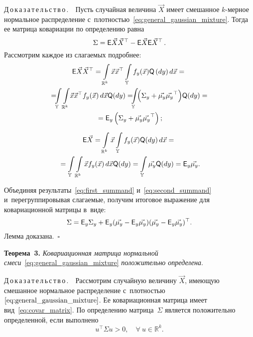 \begin{multicols}{2}
\smallskip

\noindent
Д\,о\,к\,а\,з\,а\,т\,е\,л\,ь\,с\,т\,в\,о\,.\ \
Пусть случайная величина $\vec{X}$ имеет смешанное $k$-мер\-ное нормальное 
распределение с~плотностью~\eqref{eq:general_gaussian_mixture}. 
Тогда ее матрица ковариации по определению равна 
$$
\Sigma = 
{\sf E}\vec{X}\vec{X}^\top - {\sf E}\vec{X}{\sf E}\vec{X}^\top\,.
$$
 Рассмотрим каждое из слагаемых подробнее:
\begin{multline}
{\sf E}\vec{X}\vec{X}^\top =
\int\limits_{\mathbb{R}^k} \vec{x}\vec{x}^\top 
\int\limits_\mathbb{Y} f_y(\vec{x}) {\sf Q}\,(dy) \,{d}\vec{x} = {}\\
{}=
\!\!\!\int\limits_\mathbb{Y} \int\limits_{\mathbb{R}^k} \!\vec{x}\vec{x}^\top f_y(\vec{x})\,d\vec{x} 
{\sf Q}(dy) = 
\!\!\!\int\limits_\mathbb{Y}\!\! \left( \Sigma_y + \vec{\mu_y}\vec{\mu_y}^\top \right)
\! {\sf Q}(dy) = {} \\
 {} = 
{\sf E}_y \left( \Sigma_y + \vec{\mu_y}\vec{\mu_y}^\top \right);
\label{eq:first_summand}
\end{multline}

\vspace*{-12pt}

\noindent
\begin{multline}
\label{eq:second_summand}
{\sf E}\vec{X} =\int\limits_{\mathbb{R}^k} \vec{x} 
\int\limits_\mathbb{Y} f_y(\vec{x}) {\sf Q}(dy)\, d\vec{x} ={}\\
{}=
 \int\limits_\mathbb{Y} \int\limits_{\mathbb{R}^k} \vec{x} f_y(\vec{x}) 
 \,{d}\vec{x} {\sf Q}(dy) =
  \int\limits_\mathbb{Y} \vec{\mu_y} {\sf Q}(dy) = 
{\sf E}_y \vec{\mu_y}.
\end{multline}
    
Объединяя результаты~\eqref{eq:first_summand} и~\eqref{eq:second_summand} и~перегруппировывая 
слагаемые, получим итоговое выражение для ковариационной матрицы в~виде:
\begin{equation}
\label{eq:covar_matrix}
\Sigma = {\sf E}_y \Sigma_y + {\sf E}_y
 (\vec{\mu_y} - {\sf E}_y\vec{\mu_y})(\vec{\mu_y} - {\sf E}_y\vec{\mu_y})^\top.
\end{equation}
Лемма доказана.~\hfill$\square$


\smallskip

\noindent
\textbf{Теорема~3.}
\textit{Ковариационная матрица нормальной смеси}~\eqref{eq:general_gaussian_mixture} 
\textit{положительно определена}.


\smallskip

\noindent
Д\,о\,к\,а\,з\,а\,т\,е\,л\,ь\,с\,т\,в\,о\,.\ \
Рассмотрим случайную величину $\vec{X}$, имеющую смешанное нормальное распределение 
с~плот\-ностью~$\eqref{eq:general_gaussian_mixture}$. Ее ковариационная матрица имеет 
вид~\eqref{eq:covar_matrix}. По определению матрица~$\Sigma$ является положительно определенной, 
если выполнено
$$
u^\top\Sigma u > 0,\quad \forall\  u \in \mathbb{R}^k.
$$


\end{multicols}
